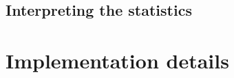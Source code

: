 \documentclass[twoside]{book}
\begin{document}
\section{Interpreting the statistics}

\chapter{Implementation details}

\listoftables
\listoffigures
\appendix                              %
\end{document}
